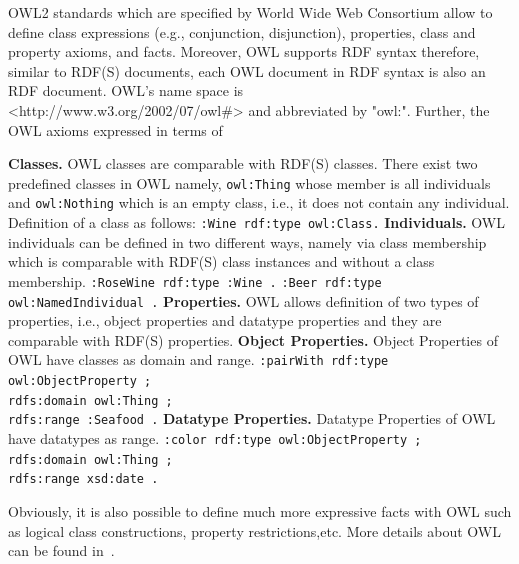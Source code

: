 OWL2 standards which are specified by World Wide Web Consortium allow to define class expressions (e.g., conjunction, disjunction), properties, class and property axioms, and facts. Moreover, OWL supports RDF syntax therefore, similar to RDF(S) documents, each OWL document in RDF syntax is also an RDF document. OWL's name space is \\<http://www.w3.org/2002/07/owl\#> and abbreviated by "owl:". Further, the OWL axioms expressed in terms of\\ 
\begin{outline}
\1 \textbf{Classes.} OWL classes are comparable with RDF(S) classes. There exist two predefined classes in OWL namely, \texttt{owl:Thing} whose member is all individuals and \texttt{owl:Nothing} which is an empty class, i.e., it does not contain any individual. Definition of a class as follows: 
    \2 \texttt{:Wine rdf:type owl:Class.}  
 \1 \textbf{Individuals.} OWL individuals can be defined in two different ways, namely via class membership which is comparable with RDF(S) class instances and without a class membership.
\2 \texttt{:RoseWine rdf:type :Wine .}
\2 \texttt{:Beer rdf:type owl:NamedIndividual .}
\1 \textbf{Properties.} OWL allows definition of two types of properties, i.e., object properties and datatype properties and they are comparable with RDF(S) properties. 
\2 \textbf{Object Properties.} Object Properties of OWL have classes as domain and range.
\3 \texttt{:pairWith rdf:type owl:ObjectProperty ;}\\
\hspace*{2.2cm}      \texttt{rdfs:domain owl:Thing ;}\\
\hspace*{2.2cm}        \texttt{rdfs:range  :Seafood .}
\2 \textbf{Datatype Properties.} Datatype Properties of OWL have datatypes as range.
\3 \texttt{:color rdf:type owl:ObjectProperty ;}\\
\hspace*{1.6cm}\texttt{rdfs:domain owl:Thing ;}\\
\hspace*{1.6cm}\texttt{rdfs:range  xsd:date . }
\end{outline} 
\noindent Obviously, it is also possible to define much more expressive facts with OWL such as logical class constructions, property restrictions,etc. More details about OWL can be found  in~\cite{DBLP:books/crc/Hitzler2010}.
